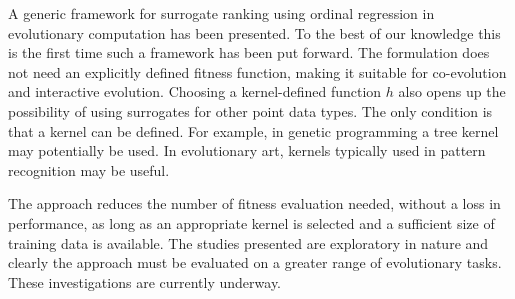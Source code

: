 \documentclass[10pt]{llncs}
\begin{document}
A generic framework for surrogate ranking using ordinal
regression in evolutionary computation has been presented. To
the best of our knowledge this is the first time such a
framework has been put forward. The formulation does not need an
explicitly defined fitness function, making it suitable for
co-evolution and interactive evolution. Choosing a
kernel-defined function $h$ also opens up the possibility of using
surrogates for other point data types. The only condition
is that a kernel can be defined.  For example, in genetic
programming a tree kernel may potentially be used. In
evolutionary art, kernels typically used in pattern recognition
may be useful.

The approach reduces the number of fitness evaluation needed,
without a loss in performance, as long as an appropriate kernel
is selected and a sufficient size of training data is available.
The studies presented are exploratory in nature and clearly the
approach must be evaluated on a greater range of evolutionary
tasks. These investigations are currently underway. 





\end{document}
